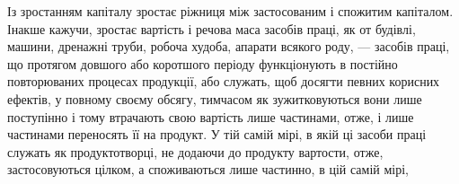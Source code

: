 Із зростанням капіталу зростає ріжниця між застосованим
і спожитим капіталом. Інакше кажучи, зростає вартість і речова
маса засобів праці, як от будівлі, машини, дренажні труби, робоча
худоба, апарати всякого роду, — засобів праці, що протягом
довшого або коротшого періоду функціонують в постійно повторюваних
процесах продукції, або служать, щоб досягти певних
корисних ефектів, у повному своєму обсягу, тимчасом як зужитковуються
вони лише поступінно і тому втрачають свою вартість
лише частинами, отже, і лише частинами переносять її на продукт.
У тій самій мірі, в якій ці засоби праці служать як продуктотворці,
не додаючи до продукту вартости, отже, застосовуються
цілком, а споживаються лише частинно, в цій самій мірі,
\parbreak{}  %
